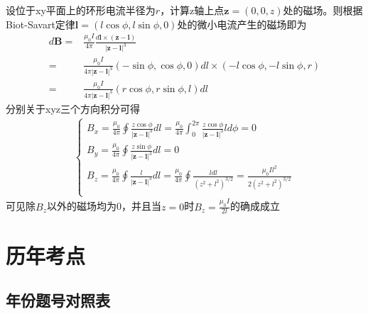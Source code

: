 设位于xy平面上的环形电流半径为$r$，计算z轴上点$\mathbf{z}=(0,0,z)$处的磁场。则根据Biot-Savart定律$\mathbf{l}=(l\cos\phi,l\sin\phi,0)$处的微小电流产生的磁场即为
\begin{align*}
    d\mathbf{B}=&\frac{\mu_0I}{4\pi}\frac{d\mathbf{l}\times(\mathbf{z}-\mathbf{l})}{|\mathbf{z}-\mathbf{l}|^3}\\
    =&\frac{\mu_0I}{4\pi|\mathbf{z}-\mathbf{l}|^3}(-\sin\phi,\cos\phi,0)dl\times(-l\cos\phi,-l\sin\phi,r)\\
    =&\frac{\mu_0I}{4\pi|\mathbf{z}-\mathbf{l}|^3}(r\cos\phi,r\sin\phi,l)dl
\end{align*}
分别关于xyz三个方向积分可得
\begin{align*}
    \begin{cases}
        B_x=\frac{\mu_0}{4\pi}\oint\frac{z\cos\phi}{|\mathbf{z}-\mathbf{l}|^3}dl
        =\frac{\mu_0}{4\pi}\int_0^{2\pi}\frac{z\cos\phi}{|\mathbf{z}-\mathbf{l}|^3}ld\phi=0\\
        B_y=\frac{\mu_0}{4\pi}\oint\frac{z\sin\phi}{|\mathbf{z}-\mathbf{l}|^3}dl=0\\
        B_z=\frac{\mu_0}{4\pi}\oint\frac{l}{|\mathbf{z}-\mathbf{l}|^3}dl
        =\frac{\mu_0}{4\pi}\oint\frac{ldl}{(z^2+l^2)^{3/2}}=\frac{\mu_0Il^2}{2(z^2+l^2)^{3/2}}\\
    \end{cases}
\end{align*}
可见除$B_z$以外的磁场均为0，并且当$z=0$时$B_z=\frac{\mu_0I}{2l}$的确成成立

\chapter{历年考点}

\section{年份题号对照表}

